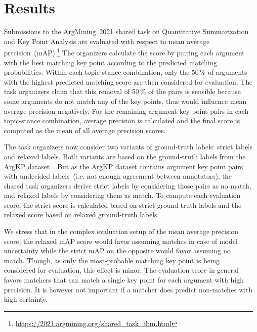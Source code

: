 \section{Results}\label{results}

Submissions to the ArgMining~2021 shared task on Quantitative Summarization and Key Point Analysis are evaluated with respect to mean average precision~(mAP).\footnote{\url{https://2021.argmining.org/shared_task_ibm.html}}
The organizers calculate the score by pairing each argument with the best matching key point according to the predicted matching probabilities.
Within each topic-stance combination, only the 50\,\% of arguments with the highest predicted matching score are then considered for evaluation.
The task organizers claim that this removal of 50\,\% of the pairs is sensible because some arguments do not match any of the key points, thus would influence mean average precision negatively. %
For the remaining argument key point pairs in each topic-stance combination, average precision is calculated and the final score is computed as the mean of all average precision scores.

The task organizers now consider two variants of ground-truth labels: strict labels and relaxed labels.
Both variants are based on the ground-truth labels from the ArgKP dataset~\cite{Bar-HaimEFKLS2020}. But as the ArgKP dataset contains argument key point pairs with undecided labels~(i.e. not enough agreement between annotators), the shared task organizers derive strict labels by considering those pairs as no match, and relaxed labels by considering them as match. %
To compute each evaluation score, the strict score is calculated based on strict ground-truth labels and the relaxed score based on relaxed ground-truth labels. %

We stress that in the complex evaluation setup of the mean average precision score, the relaxed mAP score would favor assuming matches in case of model uncertainty while the strict mAP on the opposite would favor assuming no match.
Though, as only the most-probable matching key point is being considered for evaluation, this effect is minor.
The evaluation score in general favors matchers that can match a single key point for each argument with high precision.
It is however not important if a matcher does predict non-matches with high certainty.

